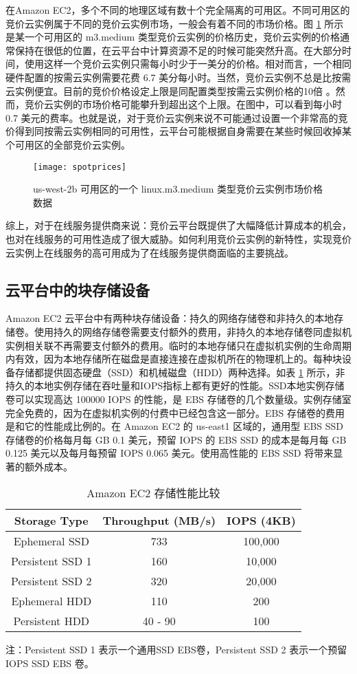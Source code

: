 在Amazon EC2，多个不同的地理区域有数十个完全隔离的可用区。不同可用区的竞价云实例属于不同的竞价云实例市场，一般会有着不同的市场价格。图 \ref{figure:sp} 所示是某一个可用区的 m3.medium 类型竞价云实例的价格历史，竞价云实例的价格通常保持在很低的位置，在云平台中计算资源不足的时候可能突然升高。在大部分时间，使用这样一个竞价云实例只需每小时少于一美分的价格。相对而言，一个相同硬件配置的按需云实例需要花费 6.7 美分每小时。当然，竞价云实例不总是比按需云实例便宜。目前的竞价价格设定上限是同配置类型按需云实例价格的10倍 \cite{AWS_SL:2014}。然而，竞价云实例的市场价格可能攀升到超出这个上限。在图中，可以看到每小时 0.7 美元的费率。也就是说，对于竞价云实例来说不可能通过设置一个非常高的竞价得到同按需云实例相同的可用性，云平台可能根据自身需要在某些时候回收掉某个可用区的全部竞价云实例。
\begin{figure}[]
  \centering
  \texttt{[image: spotprices]}
  \caption{us-west-2b 可用区的一个 linux.m3.medium 类型竞价云实例市场价格数据}
  \label{figure:sp}
\end{figure}

综上，对于在线服务提供商来说：竞价云平台既提供了大幅降低计算成本的机会，也对在线服务的可用性造成了很大威胁。如何利用竞价云实例的新特性，实现竞价云实例上在线服务的高可用成为了在线服务提供商面临的主要挑战。

\subsection{云平台中的块存储设备}
Amazon EC2 云平台中有两种块存储设备：持久的网络存储卷和非持久的本地存储卷。使用持久的网络存储卷需要支付额外的费用，非持久的本地存储卷同虚拟机实例相关联不再需要支付额外的费用。临时的本地存储只在虚拟机实例的生命周期内有效，因为本地存储所在磁盘是直接连接在虚拟机所在的物理机上的。每种块设备存储都提供固态硬盘（SSD）和机械磁盘（HDD）两种选择。如表 \ref{table:ec2storage} 所示，非持久的本地实例存储在吞吐量和IOPS指标上都有更好的性能。SSD本地实例存储卷可以实现高达 100000 IOPS 的性能，是 EBS 存储卷的几个数量级。实例存储室完全免费的，因为在虚拟机实例的付费中已经包含这一部分。EBS 存储卷的费用是和它的性能成比例的。在 Amazon EC2 的 us-east1 区域的，通用型 EBS SSD 存储卷的价格每月每 GB 0.1 美元，预留 IOPS 的 EBS SSD 的成本是每月每 GB 0.125 美元以及每月每预留 IOPS 0.065 美元。使用高性能的 EBS SSD 将带来显著的额外成本。
\begin{table}
\centering
\begin{threeparttable}
\caption{Amazon EC2 存储性能比较}
\label{table:ec2storage}
\begin{tabular}{c|c|c} \hline
Storage Type& Throughput (MB/s)& IOPS (4KB)\\
\hline
Ephemeral SSD & 733 & 100,000\\
Persistent SSD 1 & 160 & 10,000\\
Persistent SSD 2 & 320 & 20,000\\
Ephemeral HDD & 110 & 200 \\
Persistent HDD & 40 - 90 & 100\\
\hline
\end{tabular}
\small 注：Persistent SSD 1 表示一个通用SSD EBS卷，Persistent SSD 2 表示一个预留 IOPS SSD EBS 卷。 
\end{threeparttable}
\end{table}

